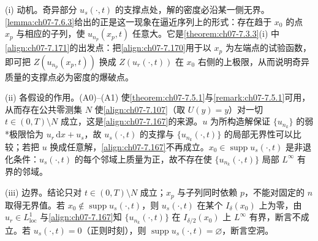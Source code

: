 \documentclass[../../main.tex]{subfiles}%
\begin{document}
\begin{remark}\label{remark:ch07-支撑爆破}
(i) 动机。奇异部分 $u_s(\cdot,t)$ 的支撑点处，解的密度必沿某一侧无界。\cref{lemma:ch07-7.6.3}给出的正是这一现象在逼近序列上的形式：存在趋于 $x_0$ 的点 $x_p$ 与相应的子列，使 $u_{n_p}(x_p,t)$ 任意大。它是\cref{theorem:ch07-7.3.3}(i) 中\eqref{align:ch07-7.171}的出发点：把\eqref{align:ch07-7.170}用于以 $x_p$ 为左端点的试验函数，即可把 $Z(u_{n_p}(x_p,t))$ 换成 $Z(u_r(\cdot,t))$ 在 $x_0$ 右侧的上极限，从而说明奇异质量的支撑点必为密度的爆破点。

(ii) 各假设的作用。(A0)--(A1) 使\cref{theorem:ch07-7.5.1}与\cref{remark:ch07-7.5.1}可用，从而存在公共零测集 $N$ 使\eqref{align:ch07-7.107}（取 $U(y)=y$）对一切 $t\in(0,T)\setminus N$ 成立，这是\eqref{align:ch07-7.167}的来源。$u$ 为所构造解保证 $\{u_{n_k}\}$ 的弱*极限恰为 $u_r\,\mathrm{d}x+u_s$，故 $u_s(\cdot,t)$ 的支撑与 $\{u_{n_k}(\cdot,t)\}$ 的局部无界性可以比较；若把 $u$ 换成任意解，\eqref{align:ch07-7.167}不再成立。$x_0\in\operatorname{supp}u_s(\cdot,t)$ 是非退化条件：$u_s(\cdot,t)$ 的每个邻域上质量为正，故不存在使 $\{u_{n_k}(\cdot,t)\}$ 局部 $L^\infty$ 有界的邻域。

(iii) 边界。结论只对 $t\in(0,T)\setminus N$ 成立；$x_p$ 与子列同时依赖 $p$，不能对固定的 $n$ 取得无界值。若 $x_0\notin\operatorname{supp}u_s(\cdot,t)$，则 $u_s(\cdot,t)$ 在某个 $I_\delta(x_0)$ 上为零，由 $u_r\in L^1_{\mathrm{loc}}$ 与\eqref{align:ch07-7.167}知 $\{u_{n_k}(\cdot,t)\}$ 在 $I_{\delta/2}(x_0)$ 上 $L^\infty$ 有界，断言不成立。若 $u_s(\cdot,t)=0$（正则时刻），则 $\operatorname{supp}u_s(\cdot,t)=\varnothing$，断言空洞。
\end{remark}
\end{document}
